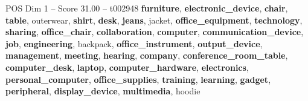 \begin{textsample}{POS Dim 1 – Score 31.00 – t002948}  \label{ex:f1_pos_012}
\textbf{furniture}, \textbf{electronic\_device}, \textbf{chair}, \textbf{table}, outerwear, \textbf{shirt}, \textbf{desk}, \textbf{jeans}, jacket, \textbf{office\_equipment}, \textbf{technology}, \textbf{sharing}, \textbf{office\_chair}, \textbf{collaboration}, \textbf{computer}, \textbf{communication\_device}, \textbf{job}, \textbf{engineering}, backpack, \textbf{office\_instrument}, \textbf{output\_device}, \textbf{management}, \textbf{meeting}, \textbf{hearing}, \textbf{company}, \textbf{conference\_room\_table}, \textbf{computer\_desk}, \textbf{laptop}, \textbf{computer\_hardware}, \textbf{electronics}, \textbf{personal\_computer}, \textbf{office\_supplies}, \textbf{training}, \textbf{learning}, \textbf{gadget}, \textbf{peripheral}, \textbf{display\_device}, \textbf{multimedia}, hoodie

\end{textsample}

